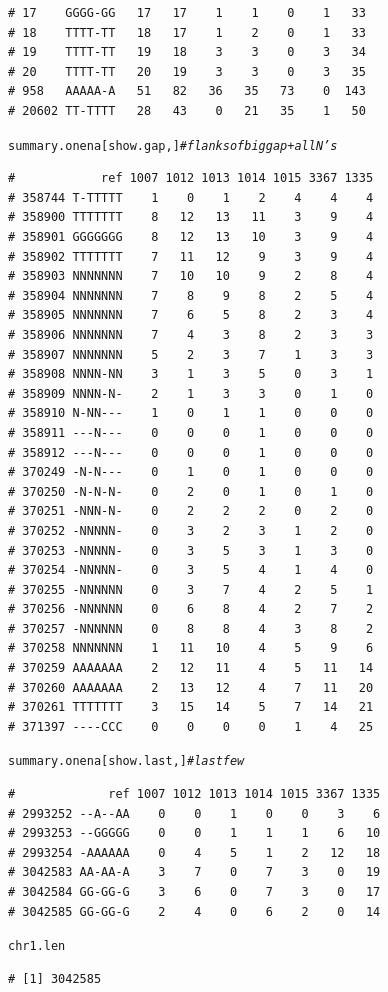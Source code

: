 \documentclass{article}\usepackage[]{graphicx}\usepackage[]{color}
\makeatletter
\newcommand{\hlcom}[1]{\textcolor[rgb]{0.678,0.584,0.686}{\textit{#1}}}%
\newcommand{\hlstd}[1]{\textcolor[rgb]{0.345,0.345,0.345}{#1}}%
\newenvironment{kframe}{%
 \def\at@end@of@kframe{}%
 \ifinner\ifhmode%
  \def\at@end@of@kframe{\end{minipage}}%
  \begin{minipage}{\columnwidth}%
 \fi\fi%
 \def\FrameCommand##1{\hskip\@totalleftmargin \hskip-\fboxsep
 \colorbox{shadecolor}{##1}\hskip-\fboxsep
     \hskip-\linewidth \hskip-\@totalleftmargin \hskip\columnwidth}%
 \MakeFramed {\advance\hsize-\width
   \@totalleftmargin\z@ \linewidth\hsize
   \@setminipage}}%
 {\par\unskip\endMakeFramed%
 \at@end@of@kframe}
\newenvironment{knitrout}{}{} %
\makeatother
\begin{document}
\begin{knitrout}
\begin{kframe}
\begin{verbatim}
# 17    GGGG-GG   17   17    1    1    0    1   33
# 18    TTTT-TT   18   17    1    2    0    1   33
# 19    TTTT-TT   19   18    3    3    0    3   34
# 20    TTTT-TT   20   19    3    3    0    3   35
# 958   AAAAA-A   51   82   36   35   73    0  143
# 20602 TT-TTTT   28   43    0   21   35    1   50
\end{verbatim}
\begin{alltt}
\hlstd{summary.onena[show.gap,]}    \hlcom{# flanks of big gap + all N's}
\end{alltt}
\begin{verbatim}
#            ref 1007 1012 1013 1014 1015 3367 1335
# 358744 T-TTTTT    1    0    1    2    4    4    4
# 358900 TTTTTTT    8   12   13   11    3    9    4
# 358901 GGGGGGG    8   12   13   10    3    9    4
# 358902 TTTTTTT    7   11   12    9    3    9    4
# 358903 NNNNNNN    7   10   10    9    2    8    4
# 358904 NNNNNNN    7    8    9    8    2    5    4
# 358905 NNNNNNN    7    6    5    8    2    3    4
# 358906 NNNNNNN    7    4    3    8    2    3    3
# 358907 NNNNNNN    5    2    3    7    1    3    3
# 358908 NNNN-NN    3    1    3    5    0    3    1
# 358909 NNNN-N-    2    1    3    3    0    1    0
# 358910 N-NN---    1    0    1    1    0    0    0
# 358911 ---N---    0    0    0    1    0    0    0
# 358912 ---N---    0    0    0    1    0    0    0
# 370249 -N-N---    0    1    0    1    0    0    0
# 370250 -N-N-N-    0    2    0    1    0    1    0
# 370251 -NNN-N-    0    2    2    2    0    2    0
# 370252 -NNNNN-    0    3    2    3    1    2    0
# 370253 -NNNNN-    0    3    5    3    1    3    0
# 370254 -NNNNN-    0    3    5    4    1    4    0
# 370255 -NNNNNN    0    3    7    4    2    5    1
# 370256 -NNNNNN    0    6    8    4    2    7    2
# 370257 -NNNNNN    0    8    8    4    3    8    2
# 370258 NNNNNNN    1   11   10    4    5    9    6
# 370259 AAAAAAA    2   12   11    4    5   11   14
# 370260 AAAAAAA    2   13   12    4    7   11   20
# 370261 TTTTTTT    3   15   14    5    7   14   21
# 371397 ----CCC    0    0    0    0    1    4   25
\end{verbatim}
\begin{alltt}
\hlstd{summary.onena[show.last,]}   \hlcom{# last few}
\end{alltt}
\begin{verbatim}
#             ref 1007 1012 1013 1014 1015 3367 1335
# 2993252 --A--AA    0    0    1    0    0    3    6
# 2993253 --GGGGG    0    0    1    1    1    6   10
# 2993254 -AAAAAA    0    4    5    1    2   12   18
# 3042583 AA-AA-A    3    7    0    7    3    0   19
# 3042584 GG-GG-G    3    6    0    7    3    0   17
# 3042585 GG-GG-G    2    4    0    6    2    0   14
\end{verbatim}
\begin{alltt}
\hlstd{chr1.len}
\end{alltt}
\begin{verbatim}
# [1] 3042585
\end{verbatim}
\end{kframe}
\end{knitrout}
\end{document}
